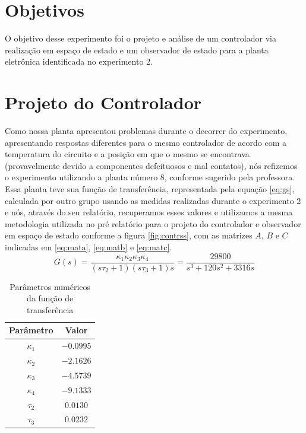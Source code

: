 \documentclass{article}
\begin{document}


\onehalfspacing
\section{Objetivos} 
O objetivo desse experimento foi o projeto e análise de um controlador via realização em espaço de estado e um observador de estado para a planta eletrônica identificada no experimento 2\cite{bb:lab2}. 
	
\section{Projeto do Controlador}
Como nossa planta apresentou problemas durante o decorrer do experimento, apresentando respostas diferentes para o mesmo controlador de acordo com a temperatura do circuito e a posição em que o mesmo se encontrava (provavelmente devido a componentes defeituosos e mal contatos), nós refizemos o experimento utilizando a planta número 8, conforme sugerido pela professora.
Essa planta teve sua função de transferência, representada pela equação \ref{eq:gs}, calculada por outro grupo usando as medidas realizadas durante o experimento 2 e nós, através do seu relatório\cite{bb:lab2gui}, recuperamos esses valores e utilizamos a mesma metodologia utilizada no pré relatório \cite{bb:prelab6} para o projeto do controlador e observador em espaço de estado conforme a figura \ref{fig:contrss}, com as matrizes $A$, $B$ e $C$ indicadas em \ref{eq:mata}, \ref{eq:matb} e \ref{eq:matc}.\\

\begin{equation}
\label{eq:gs}
G(s) = \frac{\kappa_1\kappa_2\kappa_3\kappa_4}{(s\tau_2 + 1)(s\tau_3 + 1)s} = \frac{29800}{s^3 + 120 s^2 + 3316 s}
\end{equation}

\begin{table}[H]
	\centering
	\caption{Parâmetros numéricos da função de transferência}
	\label{tab:valores}
	\begin{tabular}{|c|c|}
		\hline Parâmetro & Valor \\ 
		\hline $\kappa_1$ & $-0.0995$\\ 
		\hline $\kappa_2$ & $-2.1626$\\ 
		\hline $\kappa_3$ & $-4.5739$\\ 
		\hline $\kappa_4$ & $-9.1333$\\ 
		\hline $\tau_2$ & $0.0130$\\ 
		\hline $\tau_3$ & $0.0232$ \\ 	
		\hline 
	\end{tabular} 
\end{table}
\end{document}
